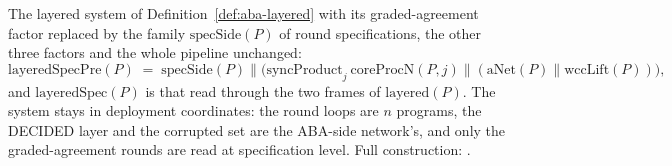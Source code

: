 \begin{definition}
  \label{def:aba-layeredspec}
  \leanok
  The layered system of Definition~\ref{def:aba-layered} with its graded-agreement factor replaced by the family $\mathrm{specSide}(P)$ of round specifications, the other three factors and the whole pipeline unchanged:
  \[
    \mathrm{layeredSpecPre}(P) \;=\;
      \mathrm{specSide}(P) \parallel \bigl(\mathrm{syncProduct}_{j}\ \mathrm{coreProcN}(P,j)
        \parallel (\mathrm{aNet}(P) \parallel \mathrm{wccLift}(P))\bigr),
  \]
  and $\mathrm{layeredSpec}(P)$ is that read through the two frames of $\mathrm{layered}(P)$.
  The system stays in deployment coordinates: the round loops are $n$ programs, the DECIDED layer and the corrupted set are the ABA-side network's, and only the graded-agreement rounds are read at specification level.
  Full construction: .
\end{definition}
